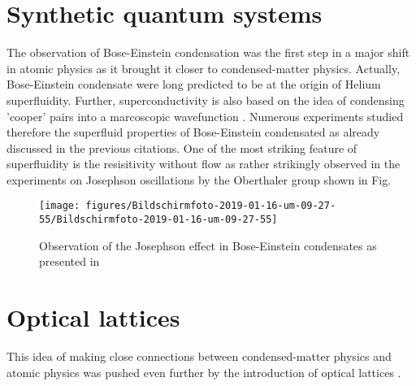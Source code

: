 \documentclass[10pt]{article}
\let\cite\citep
\providecommand\citep{\cite}
\begin{document}
\section{Synthetic quantum systems}

The observation of Bose-Einstein condensation was the first step in  a major shift in atomic physics as it brought it closer to condensed-matter physics. Actually, Bose-Einstein condensate were long predicted to be at the origin of Helium superfluidity. Further, superconductivity is also based on the idea of condensing 'cooper' pairs into a marcoscopic wavefunction \cite{superconductivity}. Numerous experiments studied therefore the superfluid properties of Bose-Einstein condensated as already discussed in the previous citations. One of the most striking feature of superfluidity is the resisitivity without flow as rather strikingly observed in the experiments on Josephson oscillations by the Oberthaler group shown in Fig.
\begin{figure}[h!]
\begin{center}
\texttt{[image: figures/Bildschirmfoto-2019-01-16-um-09-27-55/Bildschirmfoto-2019-01-16-um-09-27-55]}
\caption{{Observation of the Josephson effect in Bose-Einstein condensates as
presented in \protect\cite{Albiez_2005}
{\label{448277}}%
}}
\end{center}
\end{figure}



\section{Optical lattices}

This idea of making close connections between condensed-matter physics and atomic physics was pushed even further by the introduction of optical lattices \cite{Bloch_2008}.

\FloatBarrier


\end{document}
